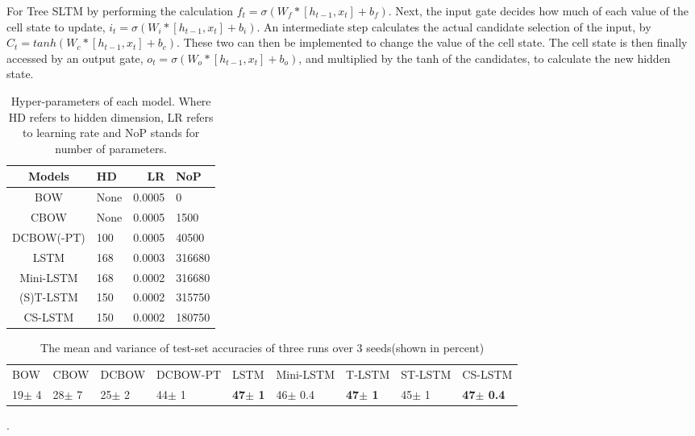 For Tree SLTM by performing the calculation $f_t = \sigma(W_f * [h_{t-1}, x_t]
+ b_f)$. Next, the input gate decides how much of each value of the cell state
to update, $i_t = \sigma(W_i * [h_{t-1}, x_t] + b_i)$. An intermediate step
calculates the actual candidate selection of the input, by $C_t = tanh(W_c *
[h_{t-1}, x_t] + b_c)$. These two can then be implemented to change the value of
the cell state. The cell state is then finally accessed by an output gate, $o_t
= \sigma(W_o * [h_{t-1}, x_t] + b_o)$, and multiplied by the tanh of the
candidates, to calculate the new hidden state.














\begin{table}[t!]
    \begin{center}
    \small
    \begin{tabular}{|c|l|r|l|}
        \hline \bf Models & \bf HD & \bf LR &\bf NoP \\ \hline
        BOW & None & 0.0005 &0\\
        CBOW & None & 0.0005 & 1500\\
        DCBOW(-PT)& 100 & 0.0005 &40500\\
        LSTM&168 & 0.0003 &316680\\
        Mini-LSTM&168 & 0.0002&316680\\
        (S)T-LSTM&150 & 0.0002&315750\\
        CS-LSTM&150 & 0.0002& 180750\\
        \hline
    \end{tabular}
    \end{center}
    \label{tab:parameters}
    \caption{Hyper-parameters of each model. Where HD refers to hidden dimension, LR refers to learning rate and NoP stands for number of parameters.}
\end{table}

\begin{table*}[t]
    \centering
    \small
    \begin{tabular}{lllllllll}
    BOW  & CBOW & DCBOW & DCBOW-PT & LSTM & Mini-LSTM & T-LSTM & ST-LSTM &CS-LSTM \\
    19$\pm$ 4 & 28$\pm$ 7 & 25$\pm$ 2 & 44$\pm$ 1 & \textbf{47$\pm$ 1} & 46$\pm$ 0.4 & \textbf{47$\pm$ 1} & 45$\pm$ 1& \textbf{47$\pm$ 0.4}
    \end{tabular}
    \label{table: results-acc}
    \caption{The mean and variance of test-set accuracies of three runs over 3 seeds(shown in percent)}.
\end{table*}


